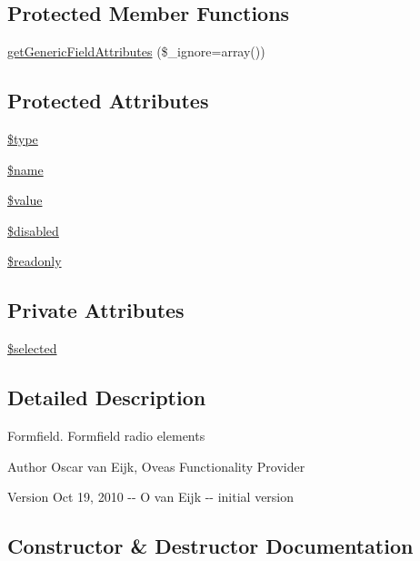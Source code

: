 \subsection*{Protected Member Functions}
\begin{DoxyCompactItemize}
\item 
\hyperlink{classFormField_a9f9d136ba8b4a793f22370aff43d592d}{getGenericFieldAttributes} (\$\_\-ignore=array())
\end{DoxyCompactItemize}
\subsection*{Protected Attributes}
\begin{DoxyCompactItemize}
\item 
\hyperlink{classFormField_a37bed21a1891e95be0e4a697e45ba51b}{\$type}
\item 
\hyperlink{classFormField_a23861f707bcd77bbace6300de9621746}{\$name}
\item 
\hyperlink{classFormField_a3c01e89834248eec8e2f145fbcfa0fbc}{\$value}
\item 
\hyperlink{classFormField_ab6f1907061890290e32cb2befc0a5f50}{\$disabled}
\item 
\hyperlink{classFormField_a78ba5d4b9127e75e8ccf86f397b5d9ac}{\$readonly}
\end{DoxyCompactItemize}
\subsection*{Private Attributes}
\begin{DoxyCompactItemize}
\item 
\hyperlink{classFormFieldRadio_a1b6abf4c527efabf94d2b5147492007e}{\$selected}
\end{DoxyCompactItemize}


\subsection{Detailed Description}
Formfield. Formfield radio elements \begin{DoxyAuthor}{Author}
Oscar van Eijk, Oveas Functionality Provider 
\end{DoxyAuthor}
\begin{DoxyVersion}{Version}
Oct 19, 2010 -\/-\/ O van Eijk -\/-\/ initial version 
\end{DoxyVersion}


\subsection{Constructor \& Destructor Documentation}
